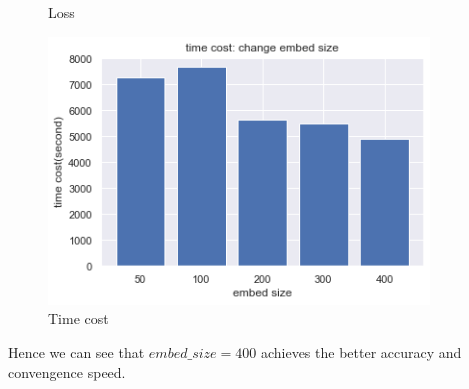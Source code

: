 \begin{figure}[H]
\begin{minipage}[b]{0.3\textwidth}
    \caption{Loss}
    \label{Fig.2}
    \end{minipage}
    \begin{minipage}[b]{0.3\textwidth}
    \centering 
    \includegraphics[width=0.9\textwidth]{time_embedsize.png}
    \caption{Time cost}
    \label{Fig.3}
    \end{minipage}
\end{figure}
Hence we can see that $embed\_size = 400$ achieves the better accuracy and convengence speed.


